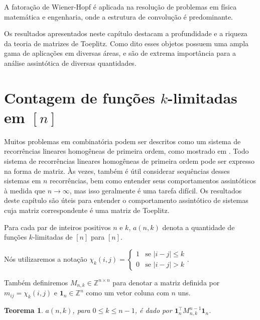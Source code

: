 \documentclass[a4paper,12pt]{article}
\newtheorem{theorem}{Teorema}
\theoremstyle{definition}
\begin{document}
A fatoração de Wiener-Hopf é aplicada na resolução de problemas em física matemática e engenharia, onde a estrutura de convolução é predominante.

Os resultados apresentados neste capítulo destacam a profundidade e a riqueza da teoria de matrizes de Toeplitz. Como dito esses objetos possuem uma ampla gama de aplicações em diversas áreas, e são de extrema importância para a análise assintótica de diversas quantidades.


\newpage

\section{Contagem de funções \texorpdfstring{$k$}{k}-limitadas em \texorpdfstring{$[n]$}{[n]}} \vspace{1cm} Muitos problemas em combinatória podem ser descritos como um sistema de recorrências lineares homogêneas de primeira ordem, como mostrado em \cite{coulson}. Todo sistema de recorrências lineares homogêneas de primeira ordem pode ser expresso na forma de matriz. Às vezes, também é útil considerar sequências desses sistemas em $n$ recorrências, bem como entender seus comportamentos assintóticos à medida que $n \to \infty$, mas isso geralmente é uma tarefa difícil. Os resultados deste capítulo são úteis para entender o comportamento assintótico de sistemas cuja matriz correspondente é uma matriz de Toeplitz.

Para cada par de inteiros positivos $n$ e $k$, $a(n,k)$ denota a quantidade de funções $k$-limitadas de $[n]$ para $[n]$.

Nós utilizaremos a notação $\chi_k(i, j) = \begin{cases} 1 & \text{se } \lvert i - j\rvert \le k \\ 0 & \text{se } \lvert i - j\rvert > k \end{cases}$.

Também definiremos $M_{n,k} \in \mathbb{Z}^{n \times n}$ para denotar a matriz definida por $m_{ij} = \chi_k(i, j)$ e $\mathbf{1}_n \in \mathbb{Z}^n$ como um vetor coluna com $n$ uns.

\begin{theorem} \label{th:matrix-form-n-to-n} $a(n,k)$, para $0 \le k \le n - 1$, é dado por $\mathbf{1}_n^\intercal M_{n,k}^{n-1} \mathbf{1}_n$. \end{theorem}
\end{document}
